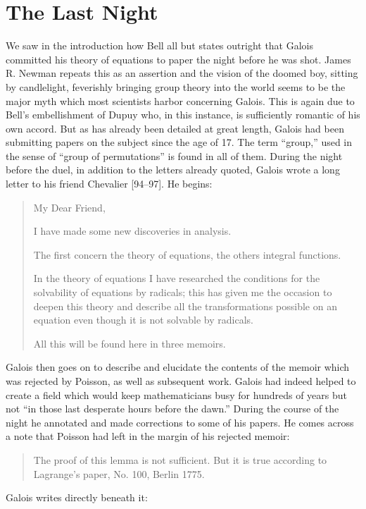 \documentclass[12pt]{article}
\begin{document}
\section{The Last Night}

We saw in the introduction how Bell all but states outright that Galois committed his theory of equations to paper the night before he was shot. James R. Newman repeats this as an assertion and the vision of the doomed boy, sitting by candlelight, feverishly bringing group theory into the world seems to be the major myth which most scientists harbor concerning Galois. This is again due to Bell's embellishment of Dupuy who, in this instance, is sufficiently romantic of his own accord. But as has already been detailed at great length, Galois had been submitting papers on the subject since the age of 17. The term ``group,'' used in the sense of ``group of permutations'' is found in all of them. During the night before the duel, in addition to the letters already quoted, Galois wrote a long letter to his friend Chevalier [94--97]. He begins:

\begin{quotation}
\noindent
My Dear Friend,
\medskip

I have made some new discoveries in analysis. 

The first concern the theory of equations, the others integral functions. 

In the theory of equations I have researched the conditions for the solvability of equations by radicals; this has given me the occasion to deepen this theory and describe all the transformations possible on an equation even though it is not solvable by radicals. 

All this will be found here in three memoirs.
\end{quotation}

Galois then goes on to describe and elucidate the contents of the memoir which was rejected by Poisson, as well as subsequent work. Galois had indeed helped to create a field which would keep mathematicians busy for hundreds of years but not ``in those last desperate hours before the dawn.'' During the course of the night he annotated and made corrections to some of his papers. He comes across a note that Poisson had left in the margin of his rejected memoir:

\begin{quote}
The proof of this lemma is not sufficient. But it is true according to Lagrange's paper, No. 100, Berlin 1775.
\end{quote}
Galois writes directly beneath it:
\end{document}
